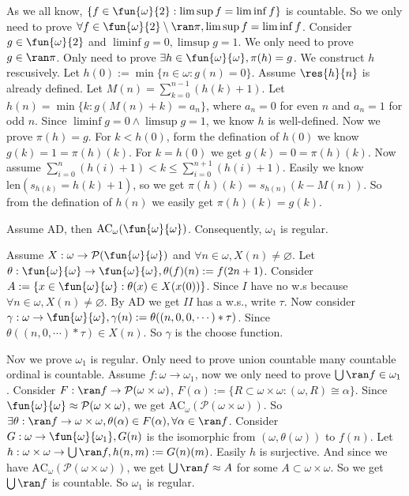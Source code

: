 \documentclass{ctexart}
\begin{document}
\begin{solution}
  As we all know, \(\{f \in \fun{\omega}{2}:\limsup f=\liminf f\}\) is countable. So we only need to prove \(\forall f \in \fun{\omega}{2}\setminus \ran \pi,\limsup f = \liminf f\). 
  Consider \(g \in \fun{\omega}{2}\) and \(\liminf g=0,\limsup g=1\). We only need to prove \(g \in \ran \pi\). 
  Only need to prove \(\exists h \in \fun{ \omega}{\omega},\pi(h)=g\). 
  We construct \(h\) rescusively. Let \(h(0):=\min\{n \in \omega:g(n)=0\}\). 
  Assume \(\res{h}{n}\) is already defined. Let \(M(n)=\sum_{k=0}^{n-1} (h(k)+1) \). 
  Let \(h(n)= \min\{k:g(M(n)+k)=a_n\}\), where \(a_n=0\) for even \(n\) and \(a_n=1\) for odd \(n\). 
  Since \(\liminf g=0 \wedge \limsup g=1\), we know \(h\) is well-defined. Now we prove \(\pi(h)=g\). 
  For \(k<h(0)\), form the defination of \(h(0)\) we know \(g(k)=1=\pi(h)(k)\). 
  For \(k=h(0)\) we get \(g(k)=0=\pi(h)(k)\). 
  Now assume \(\sum_{i=0}^{n} (h(i)+1) <k \leq \sum_{i=0}^{n+1} (h(i)+1)\). 
  Easily we know \(\mathrm{len}(s_{h(k)}=h(k)+1)\), so we get \(\pi(h)(k)=s_{h(n)}(k-M(n) )\). 
  So from the defination of \(h(n)\) we easily get \(\pi(h)(k)=g(k)\). 
\end{solution}

\begin{problem}
  Assume AD, then \(\mathrm{AC}_\omega(\fun{\omega}{\omega}) \). Consequently, \(\omega_1\) is regular. 
\end{problem}

\begin{solution}
  Assume \(X:\omega \to \mathcal{P}(\fun{\omega}{\omega})\) and \(\forall n \in \omega,X(n)\neq \varnothing\). 
  Let \(\theta:\fun{\omega}{\omega}\to \fun{\omega}{\omega},\theta(f)(n):=f(2n+1)\). 
  Consider \(A:=\{x \in \fun{\omega}{\omega}:\theta(x) \in X(x(0))\}\). 
  Since \(I\) have no w.s because \(\forall n \in \omega,X(n)\neq \varnothing\). 
  By AD we get \(II\) has a w.s., write \(\tau\). 
  Now consider \(\gamma:\omega \to \fun{\omega}{\omega},\gamma(n):=\theta((n,0,0,\cdots)*\tau)\). 
  Since \(\theta((n,0,\cdots)*\tau) \in X(n)\). So \(\gamma\) is the choose function. 
  
  Nov we prove \(\omega_1\) is regular. Only need to prove union countable many countable ordinal is countable. 
  Assume \(f: \omega \to \omega_1\), now we only need to prove \( \bigcup \ran f \in \omega_1\). 
  Consider \(F:\ran f \to \mathcal{P}(\omega \times \omega)\), \(F(\alpha):=\{R \subset \omega \times \omega:(\omega,R)\cong \alpha\}\). 
  Since \(\fun{\omega}{\omega}\approx \mathcal{P}(\omega \times \omega)\), we get \(\text{AC}_\omega(\mathcal{P}(\omega \times \omega))\). 
  So \(\exists \theta:\ran f \to \omega \times \omega,\theta(\alpha) \in F(\alpha),\forall \alpha \in \ran f\). 
  Consider \(G:\omega \to \fun{\omega}{\omega_1},G(n)\) is the isomorphic from \((\omega,\theta(\omega))\) to \(f(n)\). 
  Let \(h:\omega \times \omega \to \bigcup \ran f,h(n,m):=G(n)(m) \). Easily \(h\) is surjective. 
  And since we have \(\text{AC}_\omega(\mathcal{P}(\omega \times \omega))\), we get \(\bigcup \ran f \approx A \) for some \(A \subset \omega \times \omega\). 
  So we get \(\bigcup \ran f \) is countable. So \(\omega_1\) is regular. 
\end{solution}
\end{document}
